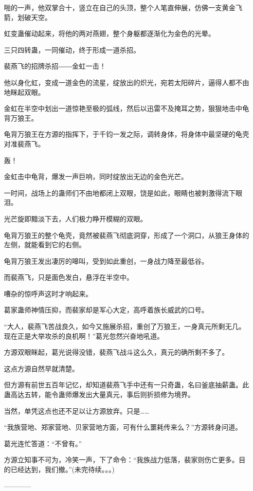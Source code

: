 \begin{this_body}
啪的一声，他双掌合十，竖立在自己的头顶，整个人笔直伸展，仿佛一支黄金飞箭，划破天空。

虹变蛊催动起来，将他的两对燕翅，整个身躯都逐渐化为金色的光晕。

三只四转蛊，一同催动，终于形成一道杀招。

裴燕飞的招牌杀招――金虹一击！

他以身化虹，变成一道金色的流星，绽放出的炽光，宛若太阳碎片，逼得人都不由地眯起双眼。

金虹在半空中划出一道惊艳至极的弧线，然后以迅雷不及掩耳之势，狠狠地击中龟背万狼王。

龟背万狼王在方源的指挥下，于千钧一发之际，调转身体，将身体中最坚硬的龟壳对准裴燕飞。

轰！

金虹击中龟背，爆发一声巨响，同时绽放出无边的金色光芒。

一时间，战场上的蛊师们不由地都闭上双眼，饶是如此，眼睛也被刺激得流下眼泪。

光芒旋即黯淡下去，人们极力睁开模糊的双眼。

龟背万狼王的整个龟壳，竟然被裴燕飞彻底洞穿，形成了一个洞口，从狼王身体的左侧，就能看到它的右侧。

龟背万狼王发出凄厉的嗥叫，受到如此重创，一身战力降至最低谷。

而裴燕飞，只是面色发白，悬浮在半空中。

嘈杂的惊呼声这时才响起来。

葛家蛊师神情压抑，而裴家却是军心大定，高呼着族长威武的口号。

“大人，裴燕飞苦战良久，如今又施展杀招，重创了万狼王，一身真元所剩无几。现在正是大举攻杀的良机啊！”葛光忽然兴奋地吼道。

方源双眼眯起，葛光说得没错，裴燕飞战斗这么久，真元的确所剩不多了。

这点方源自然早就清楚。

但方源有前世五百年记忆，却知道裴燕飞手中还有一只奇蛊，名曰釜底抽薪蛊。此蛊高达五转，能令蛊师爆发出大量真元，事后则折损修为境界。

当然，单凭这点也还不足以让方源放弃。只是……

“我族营地、郑家营地、贝家营地方面，可有什么噩耗传来么？”方源转身问道。

葛光连忙答道：“不曾有。”

方源立知事不可为，冷笑一声，下了命令：“我族战力低落，裴家则伤亡更多。目的已经达到，我们撤。”(未完待续。。。)

------------

\end{this_body}

